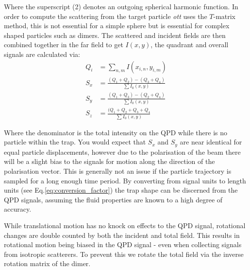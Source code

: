 Where the superscript (2) denotes an outgoing spherical harmonic
function. In order to compute the scattering from the target particle \textit{ott} uses the $T$-matrix method, this is not essential 
for a simple sphere but is essential for complex shaped particles 
such as dimers. The scattered and incident fields are then combined 
together in the far field to get $I(x,y)$, the quadrant and overall 
signals are calculated via:
\begin{align}
	Q_i &= \sum_{n,m} I(x_{i,n}, y_{i,m}) \\
	S_{x} &= \frac{(Q_1+Q_2)-(Q_3+Q_4)}{\sum I_0(x,y)} \\
	S_{y} &= \frac{(Q_1+Q_3)-(Q_2+Q_4)}{\sum I_0(x,y)} \\
	S_{z} &= \frac{(Q_1+Q_2+Q_3+Q_4}{\sum I_0(x,y)}
\end{align}

Where the denominator is the total intensity on the QPD while there is 
no particle within the trap. You would expect that $S_x$ and $S_y$ are
near identical for equal particle displacements, however due to the 
polarisation of the beam there will be a slight bias to the signals 
for motion along the direction of the polarisation vector. This is 
generally not an issue if the particle trajectory is sampled for a 
long enough time period. By converting from signal units to length
units (see Eq.\eqref{eq:conversion_factor}) the trap shape can be 
discerned from the QPD signals, assuming the fluid properties are
known to a high degree of accuracy.

While translational motion has no knock on effects to the QPD signal, 
rotational changes are double counted by both the incident and total 
field. This results in rotational motion being biased in the QPD signal 
- even when collecting signals from isotropic scatterers. To prevent 
this we rotate the total field via the inverse rotation matrix of the 
dimer.

